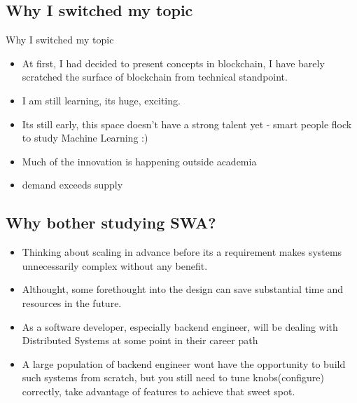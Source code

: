 \documentclass[9pt]{beamer}
\begin{document}
\subsection{Why I switched my topic}
\begin{frame}{Why I switched my topic}
  \begin{itemize}
  \item At first, I had decided to present concepts in blockchain, I have barely scratched the surface of blockchain from technical standpoint.
  \item I am still learning, its huge, exciting.
    \pause
  \item Its still early, this space doesn't have a strong talent yet - smart people flock to study Machine Learning :)
    \pause
  \item Much of the innovation is happening outside academia
    \pause
  \item demand exceeds supply
  \end{itemize}
\end{frame}


\subsection{Why bother studying SWA?}
\begin{frame}{}
  \begin{itemize}
  \item Thinking about scaling in advance before its a requirement makes systems unnecessarily complex
    without any benefit.
    \pause
  \item Althought, some forethought into the design can save substantial time and resources in the future.
    \pause
  \item As a software developer, especially backend engineer, will be dealing with Distributed Systems at some point in their career path
    \pause
  \item A large population of backend engineer wont have the opportunity to build such systems from scratch, but you still
    need to tune knobs(configure) correctly, take advantage of features to achieve that sweet spot.
    \pause
  \end{itemize}
\end{frame}

\end{document}
